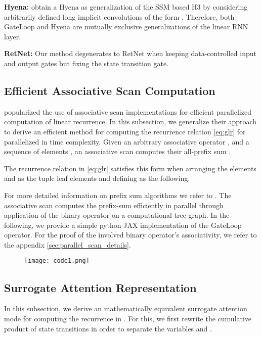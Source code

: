 \documentclass{article} \usepackage{iclr2024_conference,times}
\begin{document}
\textbf{Hyena:} \cite{poli2023hyena} obtain a Hyena as generalization of the SSM based H3 by considering arbitrarily defined long implicit convolutions of the form . Therefore, both GateLoop and Hyena are mutually exclusive generalizations of the linear RNN layer. 

\textbf{RetNet:} Our method degenerates to RetNet when keeping data-controlled input and output gates but fixing the state transition gate. 






\subsection{Efficient Associative Scan Computation}\label{sec:scan}
\cite{smith2023simplified} popularized the use of associative scan implementations for efficient parallelized computation of linear recurrence. In this subsection, we generalize their approach to derive an efficient method for computing the recurrence relation \ref{eq:glr} for  parallelized in  time complexity. Given an arbitrary associative operator , and a sequence of elements , an associative scan computes their all-prefix sum . 


The recurrence relation in \ref{eq:glr} satisfies this form when arranging the elements  and  as the tuple leaf elements  and defining  as the following. 



For more detailed information on prefix sum algorithms we refer to \cite{beloch90}. The associative scan computes the prefix-sum efficiently in parallel through application of the binary operator on a computational tree graph. In the following, we provide a simple python JAX implementation of the GateLoop operator. For the proof of the involved binary operator's associativity, we refer to the appendix \ref{sec:parallel_scan_details}.

\begin{figure}[H]
    \centering
    \texttt{[image: code1.png]}
\end{figure}







\newpage

\subsection{Surrogate Attention Representation}
In this subsection, we derive an mathematically equivalent surrogate attention mode for computing the recurrence in . For this, we first rewrite the cumulative product of state transitions in order to separate the variables  and . 
\end{document}
